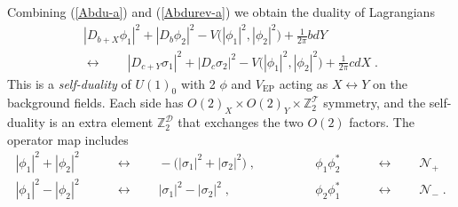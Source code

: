 \documentclass[a4paper, 12pt]{article}
\numberwithin{equation}{section}
\newcommand{\bea}{\begin{equation} \begin{aligned}} \newcommand{\eea}{\end{aligned} \end{equation}}
\newcommand{\cD}{\mathcal{D}}
\newcommand{\cN}{\mathcal{N}}
\newcommand{\cT}{\mathcal{T}}
\newcommand{\bZ}{\mathbb{Z}}
\begin{document}
Combining (\ref{Abdu-a}) and (\ref{Abdurev-a}) we obtain the duality of Lagrangians
\begin{multline}
|D_{b+X}\phi_1|^2 + |D_b \phi_2|^2 - V\big( |\phi_1|^2, |\phi_2|^2 \big) + \frac1{2\pi} bdY \\
\longleftrightarrow\qquad |D_{c+Y} \sigma_1|^2 + |D_c \sigma_2|^2 - V\big( |\phi_1|^2, |\phi_2|^2 \big) + \frac1{2\pi} cdX \;.
\end{multline}
This is a \emph{self-duality} of $U(1)_0$ with 2 $\phi$ and $V_\text{EP}$ acting as $X \leftrightarrow Y$ on the background fields. Each side has $O(2)_X \times O(2)_Y \times \bZ_2^\cT$ symmetry, and the self-duality is an extra element $\bZ_2^\cD$ that exchanges the two $O(2)$ factors. The operator map includes
\bea
|\phi_1|^2 + |\phi_2|^2 \qquad&\longleftrightarrow\qquad - \big( |\sigma_1|^2 + |\sigma_2|^2 \big) \;,\qquad\qquad &
\phi_1\phi_2^* \qquad&\longleftrightarrow\qquad \cN_+ \\
|\phi_1|^2 - |\phi_2|^2 \qquad&\longleftrightarrow\qquad |\sigma_1|^2 - |\sigma_2|^2 \;,\qquad &
\phi_2\phi_1^* \qquad&\longleftrightarrow\qquad \cN_- \;.
\eea
\end{document}
